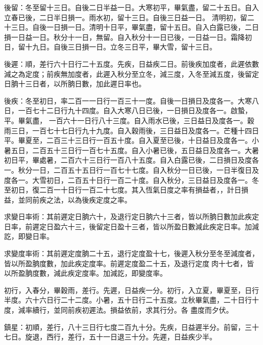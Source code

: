 \begin{pinyinscope}
 後留：冬至留十三日。自後二日半益一日。大寒初平，畢氣盡，留二十五日。自入立春已後，二日半日損一。雨水初，留十三日。自後三日益一日。
 清明初，留二十三日。自後一日損一日。清明十日平，畢氣盡，留十五日。自入白露已後，二日損一日益一日。秋分十一日，無留。自入秋分十一日已後，一日益一日。霜降初日，留十九日。自後三日損一日。立冬三日平，畢大雪，留十三日。



 後遲：順，差行六十日行二十五度。先疾，日益疾二日。前後疾加度者，此遲依數減之為定度；前疾無加度者，此遲入秋分至立冬，減三度，入冬至減五度，後留定日朒十三日者，以所朒日數，加此遲日率也。



 後疾：冬至初日，率二百一一日行一百三十一度。自後一日損日及度各一。大寒八日，一百七十二日行九十四度。自入大寒八日已後，一日損日及度各一。啟蟄，平。畢氣盡，
 一百六十一日行八十三度。自入雨水已後，三日益日及度各一。穀雨三日，一百七十七日行九十九度。自入穀雨後，三日益日及度各一。芒種十四日平。畢夏至，二百三十三日行一百五十度。自入夏至已後，十日益日及度各一。小暑五日，二百五十三日行一百七十五度。自入小暑已後，五日益日及度各一。大暑初日平，畢處暑，二百六十三日行一百八十五度。自入白露已後，二日損日及度各一。秋分一日，二百五十五日行一百七十七度。自入秋分一日已後，一日半復日及度各一。大雪初日，二百五十日行一百二十度。自入秋分，三日益日及度各一。冬
 至初日，復二百一十日行一百二十七度。其入恆氣日度之率有損益者，，計日損益，並同前疾之法，以為後疾定度之率。



 求變日率術：其前遲定日朒六十，及退行定日朒六十三者，皆以所朒日數加此疾定日率，前遲定日盈六十三，後留定日盈十三者，皆以所盈日數減此疾定日率。加減訖，即變日率。



 求變度率術：其前遲定度朒二十五，退行定度盈十七，後遲入秋分至冬至減度者，皆以所盈朒度數，加此疾定度率。前遲定度盈二十五，及退行定度肉十七者，皆以所盈朒度數，減此疾定度率。加減訖，即變度率。



 初行，入春分，畢穀雨，差行。先遲，日益疾一分。初行，入立夏，畢夏至，日行半度。六十六日行二十二度。小暑，五十日行二十五度。立秋畢氣盡，二十日行十度，減率續行，並同前疾初遲法。損益依前，求其行分。各
 盡度而夕伏。



 鎮星：初順，差行，八十三日行七度二百九十分。先疾，日益遲半分。前留，三十七日。旋退，西行，差行，五十一日退三十分。先遲，日益疾少半。




\end{pinyinscope}
